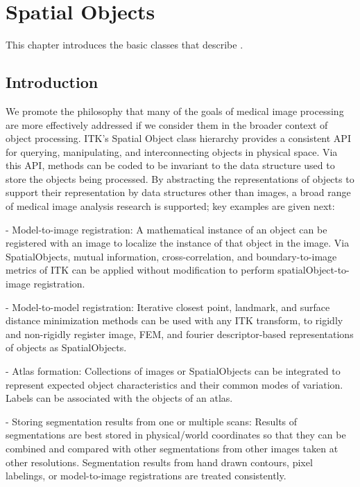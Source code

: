 
\chapter{Spatial Objects}
\label{sec:SpatialObjects}

This chapter introduces the basic classes that describe .

\section{Introduction}
\label{Introduction}

We promote the philosophy that many of the goals of medical image processing 
are more effectively addressed if we consider them in the broader context 
of object processing. ITK's Spatial Object class hierarchy provides a 
consistent API for querying, manipulating, and interconnecting objects in 
physical space.   Via this API, methods can be coded to be invariant to 
the data structure used to store the objects being processed.   By 
abstracting the representations of objects to support their representation 
by data structures other than images, a broad range of medical image 
analysis research is supported; key examples are given next:

-	Model-to-image registration: A mathematical instance of an object can be registered with an image to localize the instance of that object in the image.  Via SpatialObjects, mutual information, cross-correlation, and boundary-to-image metrics of ITK can be applied without modification to perform spatialObject-to-image registration.

-	Model-to-model registration: Iterative closest point, landmark, and surface distance minimization methods can be used with any ITK transform, to rigidly and non-rigidly register image, FEM, and fourier descriptor-based representations of objects as SpatialObjects.

-	Atlas formation: Collections of images or SpatialObjects can be integrated to represent expected object characteristics and their common modes of variation.   Labels can be associated with the objects of an atlas.

-	Storing segmentation results from one or multiple scans: Results of segmentations are best stored in physical/world coordinates so that they can be combined and compared with other segmentations from other images taken at other resolutions.  Segmentation results from hand drawn contours, pixel labelings, or model-to-image registrations are treated consistently.

